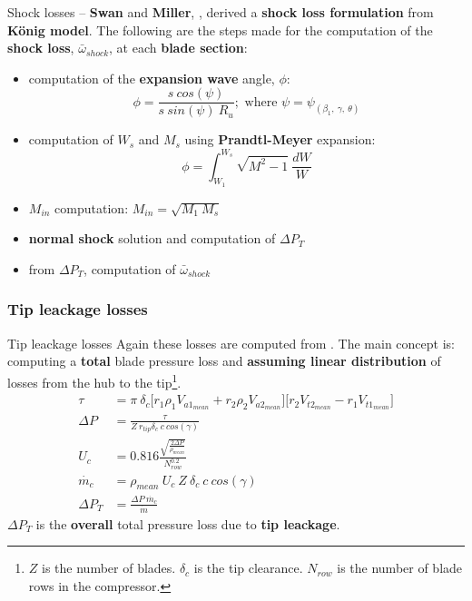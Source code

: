 	\begin{frame}{Shock losses -- }
		\textbf{Swan} and \textbf{Miller}, \cite[Sec. 6.7]{axial2004}, derived a \textbf{shock loss formulation} from \textbf{K\"onig model}. 
		\newline 
		\newline
		The following are the steps made for the computation of the \textbf{shock loss}, $\bar{\omega}_{shock}$, at each \textbf{blade section}:
		\begin{itemize}
			\item computation of the \textbf{expansion wave} angle, $\phi$: 
				\begin{equation}
					\phi = \frac{s \ cos(\psi)}{s \ sin(\psi) \ R_u}; \text{ where } \psi = \psi_{(\beta_1, \ \gamma, \ \theta)} \nonumber
				\end{equation}
			\item computation of $W_s$ and $M_s$ using \textbf{Prandtl-Meyer} expansion: 
			\begin{equation}
				\phi = \int_{W_1}^{W_s} \sqrt{M^2 - 1} \ \frac{dW}{W} \nonumber
			\end{equation}
			\item $M_{in}$ computation: $M_{in} = \sqrt{M_1 \ M_s}$
			\item \textbf{normal shock} solution and computation of $\Delta P_T$
			\item from $\Delta P_T$, computation of $\bar{\omega}_{shock}$
		\end{itemize}
	\end{frame}

\subsubsection{Tip leackage losses}
	{\nologo
	\begin{frame}{Tip leackage losses}
		Again these losses are computed from \cite[Sec. 6.9]{axial2004}. The main concept is: computing a \textbf{total} blade pressure loss and \textbf{assuming linear distribution} of losses from the hub to the tip\footnote{$Z$ is the number of blades. $\delta_c$ is the tip clearance. $N_{row}$ is the number of blade rows in the compressor.}. 
		\begin{align}
			\tau & = \pi \ \delta_c \Big[ r_1 \rho_1 V_{a1_{mean}} + r_2 \rho_2 V_{a2_{mean}} \Big] \Big[ r_2 V_{t2_{mean}} - r_1 V_{t1_{mean}} \Big] \nonumber \\ 
			\Delta P & = \frac{\tau}{Z \ r_{tip} \delta_c \ c \ cos(\gamma)} \nonumber \\ 
			U_c & = 0.816 \frac{\sqrt{\frac{2 \Delta P}{\rho_{mean}}}}{N_{row}^{0.2}} \nonumber \\ 
			\dot{m_c} & = \rho_{mean} \ U_c \ Z \ \delta_c \ c \ cos(\gamma) \nonumber \\ 
			\Delta P_T & = \frac{\Delta P \ \dot{m_c}}{\dot{m}} \nonumber  
		\end{align}
		$\Delta P_T$ is the \textbf{overall} total pressure loss due to \textbf{tip leackage}.
		\vspace{0.11cm}
	\end{frame}
	}

